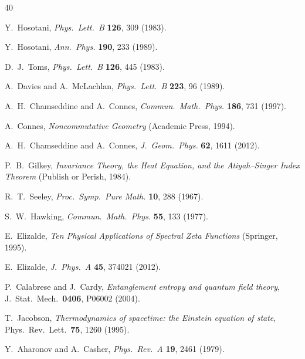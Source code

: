 \documentclass[11pt,a4paper]{article}
\theoremstyle{definition}
\theoremstyle{remark}
\begin{document}
\begin{thebibliography}{40}

  Y.~Hosotani, \emph{Phys.\ Lett.\ B} \textbf{126}, 309 (1983).

  Y.~Hosotani, \emph{Ann.\ Phys.} \textbf{190}, 233 (1989).

  D.~J.~Toms, \emph{Phys.\ Lett.\ B} \textbf{126}, 445 (1983).

  A.~Davies and A.~McLachlan, \emph{Phys.\ Lett.\ B} \textbf{223}, 96 (1989).

  A.~H.~Chamseddine and A.~Connes, \emph{Commun.\ Math.\ Phys.}
  \textbf{186}, 731 (1997).

  A.~Connes, \emph{Noncommutative Geometry} (Academic Press, 1994).

  A.~H.~Chamseddine and A.~Connes, \emph{J.\ Geom.\ Phys.}
  \textbf{62}, 1611 (2012).

  P.~B.~Gilkey, \emph{Invariance Theory, the Heat Equation, and the
  Atiyah--Singer Index Theorem} (Publish or Perish, 1984).

  R.~T.~Seeley, \emph{Proc.\ Symp.\ Pure Math.} \textbf{10}, 288 (1967).

  S.~W.~Hawking, \emph{Commun.\ Math.\ Phys.} \textbf{55}, 133 (1977).

  E.~Elizalde, \emph{Ten Physical Applications of Spectral Zeta Functions}
  (Springer, 1995).

  E.~Elizalde, \emph{J.\ Phys.\ A} \textbf{45}, 374021 (2012).

  P.~Calabrese and J.~Cardy,
  \emph{Entanglement entropy and quantum field theory},
  J.\ Stat.\ Mech.\ \textbf{0406}, P06002 (2004).

  T.~Jacobson,
  \emph{Thermodynamics of spacetime: the Einstein equation of state},
  Phys.\ Rev.\ Lett.\ \textbf{75}, 1260 (1995).

  Y.~Aharonov and A.~Casher, \emph{Phys.\ Rev.\ A} \textbf{19}, 2461 (1979).


\end{thebibliography}
\end{document}

